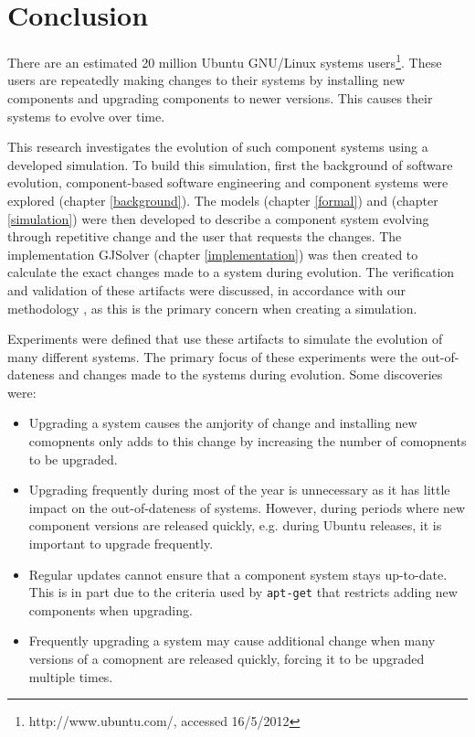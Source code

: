 \chapter{Conclusion}
\label{conclusion}
There are an estimated 20 million Ubuntu GNU/Linux systems users\footnote{http://www.ubuntu.com/, accessed 16/5/2012}.
These users are repeatedly making changes to their systems by installing new components and upgrading components to newer versions.
This causes their systems to evolve over time.

This research investigates the evolution of such component systems using a developed simulation.
To build this simulation, first the background of software evolution, component-based software engineering and component systems were explored (chapter \ref{background}).
The models \modelname (chapter \ref{formal}) and \usermodel (chapter \ref{simulation}) were then developed 
to describe a component system evolving through repetitive change and the user that requests the changes.
The implementation GJSolver (chapter \ref{implementation}) was then created to calculate the exact changes made to a system during evolution.
The verification and validation of these artifacts were discussed, in accordance with our methodology \cite{Law2005}, 
as this is the primary concern when creating a simulation.

Experiments were defined that use these artifacts to simulate the evolution of many different systems.
The primary focus of these experiments were the out-of-dateness and changes made to the systems during evolution.
Some discoveries were:
\begin{itemize}
  \item Upgrading a system causes the amjority of change 
  and installing new comopnents only adds to this change by increasing the number of comopnents to be upgraded.
  \item Upgrading frequently during most of the year is unnecessary as it has little impact on the out-of-dateness of systems.
  However, during periods where new component versions are released quickly, e.g. during Ubuntu releases, 
  it is important to upgrade frequently. 
  \item Regular updates cannot ensure that a component system stays up-to-date.
  This is in part due to the criteria used by \texttt{apt-get} that restricts adding new components when upgrading.
  \item Frequently upgrading a system may cause additional change 
  when many versions of a comopnent are released quickly, forcing it to be upgraded multiple times.
\end{itemize} 

